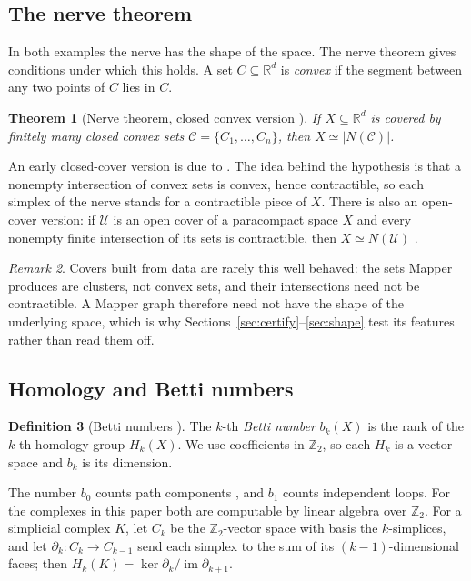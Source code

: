 \documentclass{article}
\newcommand{\R}{\mathbb{R}}
\newcommand{\Z}{\mathbb{Z}}
\newtheorem{theorem}{Theorem}[section]
\theoremstyle{definition}
\newtheorem{definition}[theorem]{Definition}
\theoremstyle{remark}
\newtheorem{remark}[theorem]{Remark}
\begin{document}
\subsection{The nerve theorem}
In both examples the nerve has the shape of the space. The nerve theorem gives conditions under which this holds.
A set $C \subseteq \R^d$ is \emph{convex} if the segment between any two points of $C$ lies in $C$.

\begin{theorem}[Nerve theorem, closed convex version {\parencite[Thm.~3.9]{bauerkerberrollrolle2023}}]\label{thm:nerve}
If $X \subseteq \R^d$ is covered by finitely many closed convex sets $\mathcal C = \{C_1, \dots, C_n\}$, then $X \simeq |N(\mathcal C)|$.
\end{theorem}
An early closed-cover version is due to \textcite[Cor.~3]{borsuk1948}.
The idea behind the hypothesis is that a nonempty intersection of convex sets is convex, hence contractible, so each simplex of the nerve stands for a contractible piece of $X$.
There is also an open-cover version: if $\mathcal U$ is an open cover of a paracompact space $X$ and every nonempty finite intersection of its sets is contractible, then $X \simeq N(\mathcal U)$ \parencite{hatcher2001}.

\begin{remark}
Covers built from data are rarely this well behaved: the sets Mapper produces are clusters, not convex sets, and their intersections need not be contractible. A Mapper graph therefore need not have the shape of the underlying space, which is why Sections~\ref{sec:certify}--\ref{sec:shape} test its features rather than read them off.
\end{remark}

\subsection{Homology and Betti numbers}
\begin{definition}[Betti numbers {\parencite{hatcher2001}}]
The $k$-th \emph{Betti number} $b_k(X)$ is the rank of the $k$-th homology group $H_k(X)$. We use coefficients in $\Z_2$, so each $H_k$ is a vector space and $b_k$ is its dimension.
\end{definition}
The number $b_0$ counts path components \parencite{hatcher2001}, and $b_1$ counts independent loops.
For the complexes in this paper both are computable by linear algebra over $\Z_2$.
For a simplicial complex $K$, let $C_k$ be the $\Z_2$-vector space with basis the $k$-simplices, and let $\partial_k : C_k \to C_{k-1}$ send each simplex to the sum of its $(k-1)$-dimensional faces; then $H_k(K) = \ker \partial_k / \operatorname{im} \partial_{k+1}$.
\end{document}
